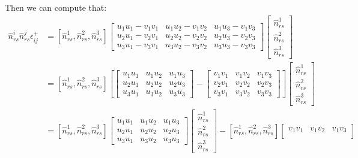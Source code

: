 \documentclass{article}
\begin{document}
	Then we can compute that:
	\begin{align}
		\hat{n}^i_{rs} \hat{n}^j_{rs} \epsilon^{+}_{ij} &= [\hat{n}^{1}_{rs} , \hat{n}^{2}_{rs} , \hat{n}^{3}_{rs}] \begin{bmatrix}
			u_1 u_1 - v_1 v_1& u_1 u_2 - v_1 v_2 & u_1 u_3 - v_1 v_3 \\
			u_2 u_1 - v_2 v_1 & u_2 u_2 - v_2 v_2 & u_2 u_3 - v_2 v_3 \\
			u_3 u_1 - v_3 v_1 & u_3 u_2 - v_3 v_2 & u_3 u_3 -v_3 v_3
		\end{bmatrix}
		\begin{bmatrix}
			\hat{n}^{1}_{rs} \\
			\hat{n}^{2}_{rs} \\
			\hat{n}^{3}_{rs}
		\end{bmatrix} \\
		&= [\hat{n}^{1}_{rs} , \hat{n}^{2}_{rs} , \hat{n}^{3}_{rs}]
		\left[
		\begin{bmatrix}
			u_1 u_1 & u_1 u_2 & u_1 u_3 \\
			u_2 u_1 & u_2 u_2 & u_2 u_3 \\
			u_3 u_1 & u_3 u_2 & u_3 u_3 
		\end{bmatrix} -
		 \begin{bmatrix}
			v_1 v_1 & v_1 v_2 & v_1 v_3 \\
			v_2 v_1 & v_2 v_2 & v_2 v_3 \\
			v_3 v_1 & v_3 v_2 & v_3 v_3 
		\end{bmatrix}
		\right]
		\begin{bmatrix}
			\hat{n}^{1}_{rs} \\
			\hat{n}^{2}_{rs} \\
			\hat{n}^{3}_{rs}
		\end{bmatrix} \\
		&= [\hat{n}^{1}_{rs} , \hat{n}^{2}_{rs} , \hat{n}^{3}_{rs}]
		\begin{bmatrix}
			u_1 u_1 & u_1 u_2 & u_1 u_3 \\
			u_2 u_1 & u_2 u_2 & u_2 u_3 \\
			u_3 u_1 & u_3 u_2 & u_3 u_3 
		\end{bmatrix}
		\begin{bmatrix}
			\hat{n}^{1}_{rs} \\
			\hat{n}^{2}_{rs} \\
			\hat{n}^{3}_{rs}
		\end{bmatrix}
		-
		[\hat{n}^{1}_{rs} , \hat{n}^{2}_{rs} , \hat{n}^{3}_{rs}]
		\begin{bmatrix}
			v_1 v_1 & v_1 v_2 & v_1 v_3 \\

\end{bmatrix}
\end{align}
\end{document}
